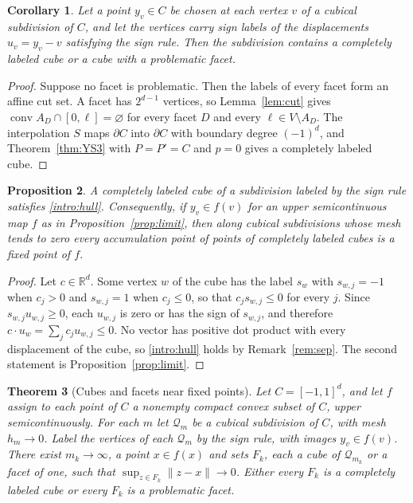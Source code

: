 \documentclass[11pt]{amsart}
\newtheorem{thm}{Theorem}[section]
\newtheorem{cor}[thm]{Corollary}
\newtheorem{prop}[thm]{Proposition}
\theoremstyle{definition}
\theoremstyle{remark}
\numberwithin{equation}{section}
\newcommand{\R}{\mathbb R}
\DeclareMathOperator{\conv}{conv}
\begin{document}
\begin{cor}\label{cor:marked}
Let a point $y_v\in C$ be chosen at each vertex $v$ of a cubical subdivision of $C$, and let the vertices carry sign labels of the displacements $u_v=y_v-v$ satisfying the sign rule. Then the subdivision contains a completely labeled cube or a cube with a problematic facet.
\end{cor}

\begin{proof}
Suppose no facet is problematic. Then the labels of every facet form an affine cut set. A facet has $2^{d-1}$ vertices, so Lemma~\ref{lem:cut} gives $\conv A_D\cap[0,\ell]=\varnothing$ for every facet $D$ and every $\ell\in V\setminus A_D$. The interpolation $S$ maps $\partial C$ into $\partial C$ with boundary degree $(-1)^d$, and Theorem~\ref{thm:YS3} with $P=P'=C$ and $p=0$ gives a completely labeled cube.
\end{proof}

\begin{prop}\label{prop:cubehull}
A completely labeled cube of a subdivision labeled by the sign rule satisfies \eqref{intro:hull}. Consequently, if $y_v\in f(v)$ for an upper semicontinuous map $f$ as in Proposition~\ref{prop:limit}, then along cubical subdivisions whose mesh tends to zero every accumulation point of points of completely labeled cubes is a fixed point of $f$.
\end{prop}

\begin{proof}
Let $c\in\R^d$. Some vertex $w$ of the cube has the label $s_w$ with $s_{w,j}=-1$ when $c_j>0$ and $s_{w,j}=1$ when $c_j\le0$, so that $c_js_{w,j}\le0$ for every $j$. Since $s_{w,j}u_{w,j}\ge0$, each $u_{w,j}$ is zero or has the sign of $s_{w,j}$, and therefore $c\cdot u_w=\sum_jc_ju_{w,j}\le0$. No vector has positive dot product with every displacement of the cube, so \eqref{intro:hull} holds by Remark~\ref{rem:sep}. The second statement is Proposition~\ref{prop:limit}.
\end{proof}


\begin{thm}[Cubes and facets near fixed points]\label{4.4}
Let $C=[-1,1]^d$, and let $f$ assign to each point of $C$ a nonempty compact convex subset of $C$, upper semicontinuously. For each $m$ let $\mathcal Q_m$ be a cubical subdivision of $C$, with mesh $h_m\to0$. Label the vertices of each $\mathcal Q_m$ by the sign rule, with images $y_v\in f(v)$. There exist $m_k\to\infty$, a point $x\in f(x)$ and sets $F_k$, each a cube of $\mathcal Q_{m_k}$ or a facet of one, such that $\sup_{z\in F_k}\|z-x\|\to0$. Either every $F_k$ is a completely labeled cube or every $F_k$ is a problematic facet.
\end{thm}
\end{document}
